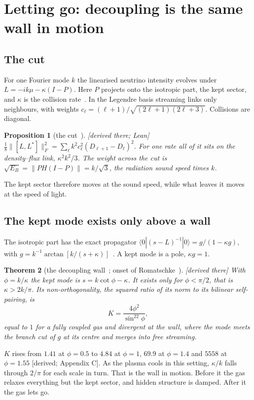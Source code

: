 \documentclass[11pt]{article}
\newtheorem{theorem}{Theorem}\newtheorem{proposition}[theorem]{Proposition}\newtheorem{lemma}[theorem]{Lemma}
\theoremstyle{definition}\newtheorem{hypothesis}{Hypothesis}\newtheorem{prediction}{Prediction}
\theoremstyle{remark}\newtheorem{remark}[theorem]{Remark}
\newcommand{\grade}[1]{\textsf{\small[#1]}}
\begin{document}
\section{Letting go: decoupling is the same wall in motion}\label{sec:letgo}

\subsection{The cut}
For one Fourier mode $k$ the linearised neutrino intensity evolves under $L=-ik\mu-\kappa(I-P)$. Here $P$ projects onto the isotropic part, the kept sector, and $\kappa$ is the collision rate~\cite{McC,NU10}. In the Legendre basis streaming links only neighbours, with weights $c_\ell=(\ell+1)/\sqrt{(2\ell+1)(2\ell+3)}$. Collisions are diagonal.
\begin{proposition}[the cut~\cite{NU10,CE}]\grade{derived there; Lean}
$\tfrac18\lVert[L,L^*]\rVert_F^2=\sum_\ell k^2c_\ell^2(D_{\ell+1}-D_\ell)^2$. For one rate all of it sits on the density--flux link, $\kappa^2k^2/3$. The weight across the cut is $\sqrt{E_B}=\lVert PH(I-P)\rVert=k/\sqrt3$, the radiation sound speed times $k$.
\end{proposition}
The kept sector therefore moves at the sound speed, while what leaves it moves at the speed of light.

\subsection{The kept mode exists only above a wall}
The isotropic part has the exact propagator $\langle0|(s-L)^{-1}|0\rangle=g/(1-\kappa g)$, with $g=k^{-1}\arctan[k/(s+\kappa)]$~\cite{NU10}. A kept mode is a pole, $\kappa g=1$.
\begin{theorem}[the decoupling wall~\cite{NU10}; onset of Romatschke~\cite{Rom}]\label{thm:onset}\grade{derived there}
With $\phi=k/\kappa$ the kept mode is $s=k\cot\phi-\kappa$. It exists only for $\phi<\pi/2$, that is $\kappa>2k/\pi$. Its non-orthogonality, the squared ratio of its norm to its bilinear self-pairing, is
\begin{equation}
K=\frac{4\phi^2}{\sin^22\phi},
\end{equation}
equal to $1$ for a fully coupled gas and divergent at the wall, where the mode meets the branch cut of $g$ at its centre and merges into free streaming.
\end{theorem}
$K$ rises from $1.41$ at $\phi=0.5$ to $4.84$ at $\phi=1$, $69.9$ at $\phi=1.4$ and $5558$ at $\phi=1.55$ \grade{derived; Appendix C}. As the plasma cools in this setting, $\kappa/k$ falls through $2/\pi$ for each scale in turn. That is the wall in motion. Before it the gas relaxes everything but the kept sector, and hidden structure is damped. After it the gas lets go.
\end{document}
